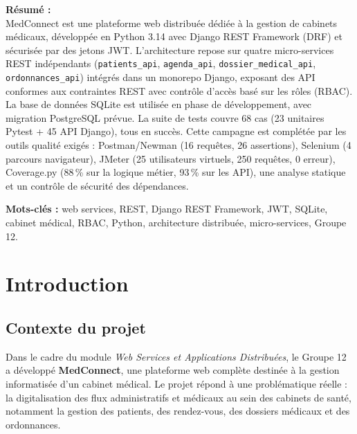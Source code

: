 \documentclass[12pt,a4paper]{report}
\begin{document}
\vspace{0.5cm}

\noindent\textbf{Résumé :}\\
MedConnect est une plateforme web distribuée dédiée à la gestion de cabinets médicaux, développée en Python 3.14 avec Django REST Framework (DRF) et sécurisée par des jetons JWT. L'architecture repose sur quatre micro-services REST indépendants (\texttt{patients\_api}, \texttt{agenda\_api}, \texttt{dossier\_medical\_api}, \texttt{ordonnances\_api}) intégrés dans un monorepo Django, exposant des API conformes aux contraintes REST avec contrôle d'accès basé sur les rôles (RBAC). La base de données SQLite est utilisée en phase de développement, avec migration PostgreSQL prévue. La suite de tests couvre 68 cas (23 unitaires Pytest + 45 API Django), tous en succès. Cette campagne est complétée par les outils qualité exigés : Postman/Newman (16 requêtes, 26 assertions), Selenium (4 parcours navigateur), JMeter (25 utilisateurs virtuels, 250 requêtes, 0 erreur), Coverage.py (88\,\% sur la logique métier, 93\,\% sur les API), une analyse statique et un contrôle de sécurité des dépendances.

\vspace{0.4cm}

\noindent\textbf{Mots-clés :} web services, REST, Django REST Framework, JWT, SQLite, cabinet médical, RBAC, Python, architecture distribuée, micro-services, Groupe 12.

\newpage
\tableofcontents

\newpage
\listoffigures
\listoftables

\newpage
\chapter{Introduction}

\section{Contexte du projet}

Dans le cadre du module \textit{Web Services et Applications Distribuées}, le Groupe 12 a développé \textbf{MedConnect}, une plateforme web complète destinée à la gestion informatisée d'un cabinet médical. Le projet répond à une problématique réelle : la digitalisation des flux administratifs et médicaux au sein des cabinets de santé, notamment la gestion des patients, des rendez-vous, des dossiers médicaux et des ordonnances.
\end{document}
